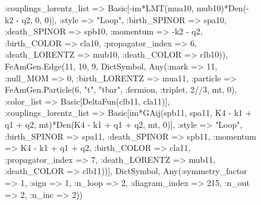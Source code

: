 \documentclass{revtex4}
\begin{document}
\begin{figure}[!htb]
\begin{center}
{:couplings_lorentz_list => Basic[-im*LMT(mua10, mub10)*Den(-k2 - q2, 0, 0)], :style => "Loop", :birth_SPINOR => spa10, :death_SPINOR => spb10, :momentum => -k2 - q2, :birth_COLOR => cla10, :propagator_index => 6, :death_LORENTZ => mub10, :death_COLOR => clb10)), FeAmGen.Edge(11, 10, 9, Dict{Symbol, Any}(:mark => 11, :null_MOM => 0, :birth_LORENTZ => mua11, :particle => FeAmGen.Particle(6, "t", "tbar", :fermion, :triplet, 2//3, mt, 0), :color_list => Basic[DeltaFun(clb11, cla11)], :couplings_lorentz_list => Basic[im*GAij(spb11, spa11, K4 - k1 + q1 + q2, mt)*Den(K4 - k1 + q1 + q2, mt, 0)], :style => "Loop", :birth_SPINOR => spa11, :death_SPINOR => spb11, :momentum => K4 - k1 + q1 + q2, :birth_COLOR => cla11, :propagator_index => 7, :death_LORENTZ => mub11, :death_COLOR => clb11))], Dict{Symbol, Any}(:symmetry_factor => 1, :sign => 1, :n_loop => 2, :diagram_index => 215, :n_out => 2, :n_inc => 2)) 
}
\end{center}
\end{figure}
\end{document}
